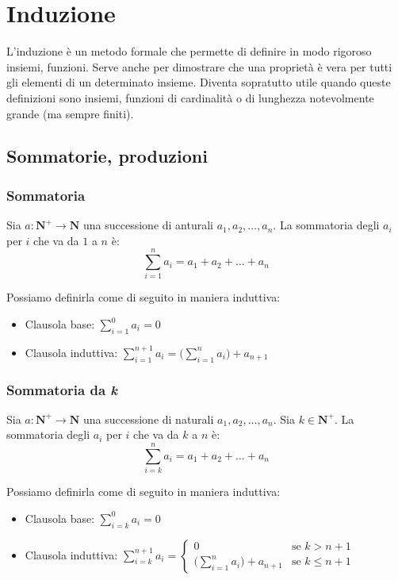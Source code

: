 \newpage
\section{Induzione}
L'induzione è un metodo formale che permette di definire in modo rigoroso insiemi, funzioni. Serve anche per dimostrare che una proprietà è vera per tutti gli elementi di un determinato insieme. Diventa sopratutto utile quando queste definizioni sono insiemi, funzioni di cardinalità o di lunghezza notevolmente grande (ma sempre finiti).

\subsection{Sommatorie, produzioni}
\subsubsection{Sommatoria}
\begin{definition}
	Sia $a:\mathbf{N}^+ \rightarrow \mathbf{N}$ una successione di anturali $a_1, a_2, \ldots, a_n$. La sommatoria degli $a_i$ per $i$ che va da $1$ a $n$ è:
	\begin{equation}
		\sum\limits_{i=1}^n a_i = a_1 + a_2 + \ldots + a_n
	\end{equation}
\end{definition}
Possiamo definirla come di seguito in maniera induttiva:
\begin{itemize}
	\item Clausola base: $\sum\limits_{i=1}^0 a_i = 0$
	\item Clausola induttiva: $\sum\limits_{i=1}^{n+1} a_i = \bigg(\sum\limits_{i=1}^n a_i) + a_{n+1}$
\end{itemize}

\subsubsection{Sommatoria da \emph{k}}
\begin{definition}
	Sia $a:\mathbf{N}^+ \rightarrow \mathbf{N}$ una successione di naturali $a_1, a_2, \ldots, a_n$. Sia $k \in \mathbf{N}^+$. La sommatoria degli $a_i$ per $i$ che va da $k$ a $n$ è:
	\begin{equation}
		\sum\limits_{i=k}^n a_i = a_1 + a_2 + \ldots + a_n
	\end{equation}
\end{definition}
Possiamo definirla come di seguito in maniera induttiva:
\begin{itemize}
	\item Clausola base: $\sum\limits_{i=k}^0 a_i = 0$
	\item Clausola induttiva:
	$ \sum\limits_{i=k}^{n+1} a_i = 
	\begin{cases}
		0 & \text{se } k > n+1 \\
		\bigg(\sum\limits_{i=1}^n a_i) + a_{n+1} & \text{se } k \leq n+1
	\end{cases}$
\end{itemize}

